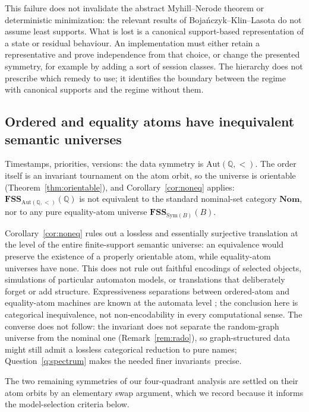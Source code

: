 \documentclass{lmcs}
\newcommand{\Sym}{\mathrm{Sym}}
\newcommand{\Aut}{\mathrm{Aut}}
\newcommand{\Nom}{\mathbf{Nom}}
\newcommand{\FSS}{\mathbf{FSS}}
\begin{document}
This failure does not invalidate the abstract Myhill--Nerode theorem or
deterministic minimization: the relevant results of Boja\'nczyk--Klin--Lasota
\cite[Thm.~3.8 and Thm.~5.2]{BKL14} do not assume least supports. What is
lost is a canonical support-based representation of a state or residual
behaviour. An implementation must either retain a representative and prove
independence from that choice, or change the presented symmetry, for example
by adding a sort of session classes. The hierarchy does not prescribe which
remedy to use; it identifies the boundary between the regime with canonical
supports and the regime without them.

\subsection{Ordered and equality atoms have inequivalent semantic universes}
\label{subsec:ordered}

Timestamps, priorities, versions: the data symmetry is
$\Aut(\mathbb Q,<)$. The order itself is an invariant tournament on
the atom orbit, so the universe is orientable
(Theorem~\ref{thm:orientable}), and
Corollary~\ref{cor:noneq} applies: $\FSS_{\Aut(\mathbb Q,<)}(\mathbb
Q)$ is not equivalent to the standard nominal-set category $\Nom$, nor to any
pure equality-atom universe $\FSS_{\Sym(B)}(B)$.

Corollary~\ref{cor:noneq} rules out a lossless and essentially
surjective translation at the level of the entire finite-support semantic
universe: an equivalence would preserve the existence of a properly
orientable atom, while equality-atom universes have none. This does not rule
out faithful encodings of selected objects, simulations of particular
automaton models, or translations that deliberately forget or add structure.
Expressiveness separations between ordered-atom and equality-atom machines
are known at the automata level \cite{BKL14}; the conclusion here is
categorical inequivalence, not non-encodability in every computational
sense.
The converse does not follow: the invariant does not separate the random-graph universe from the nominal one (Remark~\ref{rem:rado}), so graph-structured data might still admit a lossless categorical reduction to pure names; Question~\ref{q:spectrum} makes the needed finer invariants~precise.

The two remaining symmetries of our four-quadrant analysis are settled on their atom orbits by an elementary swap argument, which we record because it informs the model-selection criteria below.
\end{document}
